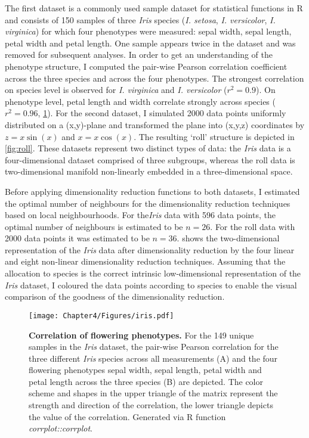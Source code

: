 The first dataset is a commonly used sample dataset for statistical functions in R and consists of \num{150} samples of three \textit{Iris} species (\textit{I. setosa}, \textit{I. versicolor}, \textit{I. virginica}) for which four phenotypes were measured:  sepal width, sepal length, petal width and petal length. One sample appears twice in the dataset and was removed for subsequent analyses. In order to get an understanding of the phenotype structure, I computed the pair-wise Pearson correlation coefficient across the three species and across the four phenotypes. The strongest correlation on species level is observed for  \textit{I. virginica} and \textit{I. versicolor} (\(r^2=0.9\)). On phenotype level, petal length and width correlate strongly across species (\(r^2=0.96\), \cref{fig:iris}). For the second dataset, I simulated \num{2000} data points uniformly distributed on a (x,y)-plane and transformed the plane into (x,y,z) coordinates by \(z = x \sin(x)\) and \(x = x \cos(x)\). The resulting `roll' structure is depicted in \cref{fig:roll}. These datasets represent two distinct types of data: the \textit{Iris} data is a four-dimensional dataset comprised of three subgroups, whereas the roll data is two-dimensional manifold non-linearly embedded in a three-dimensional space. 

Before applying dimensionality reduction functions to both datasets, I estimated the optimal number of neighbours for the dimensionality reduction techniques based on local neighbourhoods. For the\textit{Iris} data with \num{596} data points, the optimal number of neighbours is estimated to be \(n=26\). For the roll data with \num{2000} data points it was estimated to be \(n=36\).  shows the two-dimensional representation of the \textit{Iris} data after dimensionality reduction by the four linear and eight non-linear dimensionality reduction techniques. Assuming that the allocation to species is the correct intrinsic low-dimensional representation of the \textit{Iris} dataset, I coloured the data points according to species to enable the visual comparison of the goodness of the dimensionality reduction.

\begin{figure}[h]
	\centering
			\texttt{[image: Chapter4/Figures/iris.pdf]}		
	\caption[\textbf{Correlation of flowering phenotypes.}]{\textbf{Correlation of flowering phenotypes.} For the \num{149} unique samples in the \textit{Iris} dataset, the pair-wise  Pearson correlation for the three different \textit{Iris} species across all measurements (A) and the four flowering phenotypes sepal width, sepal length, petal width and petal length across the three species (B) are depicted. The color scheme and shapes in the upper triangle of the matrix represent the strength and direction of the correlation, the lower triangle depicts the value of the correlation. Generated via R function \textit{corrplot::corrplot}.} 
		\label{fig:iris}
\end{figure}%

